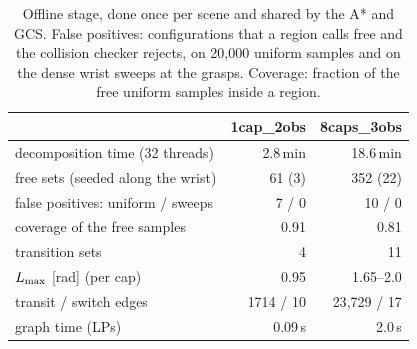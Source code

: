 \begin{table}[t]
\centering
\caption{Offline stage, done once per scene and shared by the A* and GCS.
False positives: configurations that a region calls free and the collision
checker rejects, on 20{,}000 uniform samples and on the dense wrist sweeps at
the grasps. Coverage: fraction of the free uniform samples inside a region.}
\label{tab:offline}
\setlength{\tabcolsep}{4pt}
\begin{tabular}{@{}l r r@{}}
\toprule
 & \textsf{1cap\_2obs} & \textsf{8caps\_3obs}\\
\midrule
decomposition time (32 threads) & 2.8\,min & 18.6\,min\\
free sets (seeded along the wrist) & 61 (3) & 352 (22)\\
false positives: uniform / sweeps & 7 / 0 & 10 / 0\\
coverage of the free samples & 0.91 & 0.81\\
\midrule
transition sets & 4 & 11\\
$L_{\max}$ [rad] (per cap) & 0.95 & 1.65--2.0\\
transit / switch edges & 1714 / 10 & 23{,}729 / 17\\
graph time (LPs) & 0.09\,s & 2.0\,s\\
\bottomrule
\end{tabular}
\end{table}

